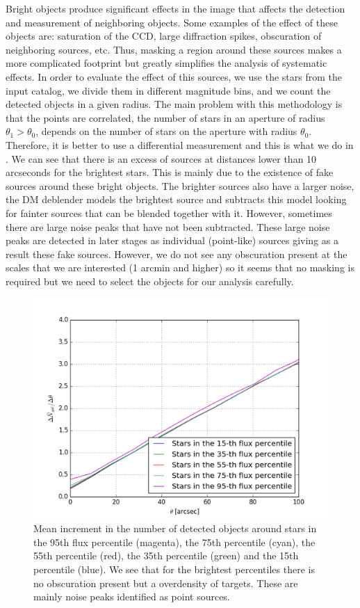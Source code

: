 \documentclass[\docopts]{\docclass}
\begin{document}
Bright objects produce significant effects in the image that affects the detection and measurement of neighboring objects. Some examples of the effect of these objects are: saturation of the CCD, large diffraction spikes, obscuration of neighboring sources, etc. Thus, masking a region around these sources makes a more complicated footprint but greatly simplifies the analysis of systematic effects. In order to evaluate the effect of this sources, we use the stars from the input catalog, we divide them in different magnitude bins, and we count the detected objects in a given radius. The main problem with this methodology is that the points are correlated, the number of stars in an aperture of radius $\theta_{1} > \theta_{0}$, depends on the number of stars on the aperture with radius $\theta_{0}$. Therefore, it is better to use a differential measurement and this is what we do in . We can see that there is an excess of sources at distances lower than 10 arcseconds for the brightest stars. This is mainly due to the existence of fake sources around these bright objects. The brighter sources also have a larger noise, the DM deblender models the brightest source and subtracts this model looking for fainter sources that can be blended together with it. However, sometimes there are large noise peaks that have not been subtracted. These large noise peaks are detected in later stages as individual (point-like) sources giving as a result these fake sources. However, we do not see any obscuration present at the scales that we are interested (1 arcmin and higher) so it seems that no masking is required but we need to select the objects for our analysis carefully.

\begin{figure}
\centering
\includegraphics[width=0.9\columnwidth]{dngal_dtheta.png}
\caption{Mean increment in the number of detected objects around stars in the 95th flux percentile (magenta), the 75th percentile (cyan), the 55th percentile (red), the 35th percentile (green) and the 15th percentile (blue). We see that for the brightest percentiles there is no obscuration present but a overdensity of targets. These are mainly noise peaks identified as point sources.}
\label{fig:galdens_derivative}
\end{figure}
\end{document}
